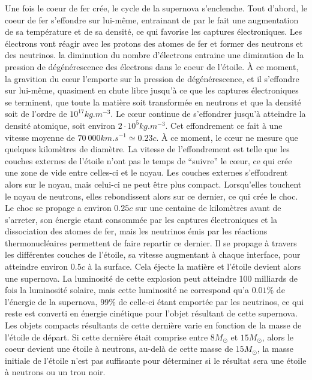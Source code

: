 \documentclass[11pt]{book} %
\begin{document}
Une fois le coeur de fer crée, le cycle de la supernova s'enclenche. Tout d'abord, le coeur de fer s'effondre sur lui-même, entrainant de par le fait une augmentation de sa température et de sa densité, ce qui favorise les captures électroniques. Les électrons vont réagir avec les protons des atomes de fer et former des neutrons et des neutrinos. la diminution du nombre d'électrons entraine une diminution de la pression de dégénérescence des électrons dans le coeur de l'étoile.\n
À ce moment, la gravition du c{\oe}ur l'emporte sur la pression de dégénérescence, et il s'effondre sur lui-même, quasiment en chute libre jusqu'à ce que les captures électroniques se terminent, que toute la matière soit transformée en neutrons et que la densité soit de l'ordre de \(10^{17}kg.m^{-3}\). Le c{\oe}ur continue de s'effondrer jusqu'à atteindre la densité atomique, soit environ \(2\cdot 10^5kg.m^{-3}\). Cet effondrement ce fait à une vitesse moyenne de \(70\ 000km.s^{-1}\simeq 0.23c\). À ce moment, le c{\oe}ur ne mesure que quelques kilomètres de diamètre.\n
La vitesse de l'effondrement est telle que les couches externes de l'étoile n'ont pas le temps de ``suivre'' le c{\oe}ur, ce qui crée une zone de vide entre celles-ci et le noyau. Les couches externes s'effondrent alors sur le noyau, mais celui-ci ne peut être plus compact. Lorsqu'elles touchent le noyau de neutrons, elles rebondissent alors sur ce dernier, ce qui crée le choc.\n
Le choc se propage a environ \(0.25c\) sur une centaine de kilomètres avant de s'arreter, son énergie etant consommée par les captures électroniques et la dissociation des atomes de fer, mais les neutrinos émis par les réactions thermonucléaires permettent de faire repartir ce dernier. Il se propage à travers les différentes couches de l'étoile, sa vitesse augmentant à chaque interface, pour atteindre environ \(0.5c\) à la surface. Cela éjecte la matière et l'étoile devient alors une supernova.\n
La luminosité de cette explosion peut atteindre 100 milliards de fois la luminosité solaire, mais cette luminosité ne correspond qu'a \(0.01\%\) de l'énergie de la supernova, \(99\%\) de celle-ci étant emportée par les neutrinos, ce qui reste est converti en énergie cinétique pour l'objet résultant de cette supernova.\n
Les objets compacts résultants de cette dernière varie en fonction de la masse de l'étoile de départ. Si cette dernière était comprise entre \(8M_\odot\) et \(15M_\odot\), alors le coeur devient une étoile à neutrons, au-delà de cette masse de \(15M_\odot\), la masse initiale de l'étoile n'est pas suffisante pour déterminer si le résultat sera une étoile à neutrons ou un trou noir.
\end{document}
